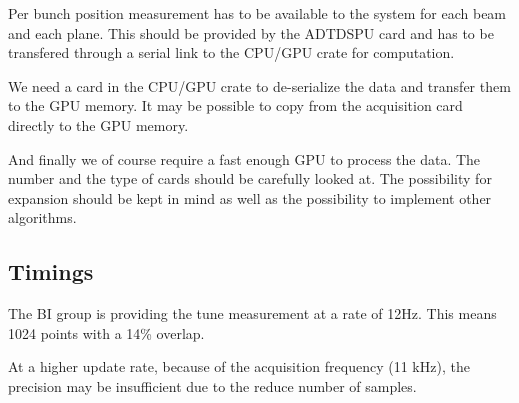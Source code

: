 Per bunch position measurement has to be available to the system for each beam and each plane. This should be provided by the \gls{ADTDSPU} card and has to be transfered through a serial link to the CPU/GPU crate for computation.

We need a card in the CPU/GPU crate to de-serialize the data and transfer them to the GPU memory. It may be possible to copy from the acquisition card directly to the GPU memory.

And finally we of course require a fast enough GPU to process the data. The number and the type of cards should be carefully looked at. The possibility for expansion should be kept in mind as well as the possibility to implement other algorithms.

\subsection{Timings}

The \gls{BI} group is providing the tune measurement at a rate of 12Hz. This means 1024 points with a 14\% overlap. 

At a higher update rate, because of the acquisition frequency (11 kHz), the precision may be insufficient due to the reduce number of samples.
